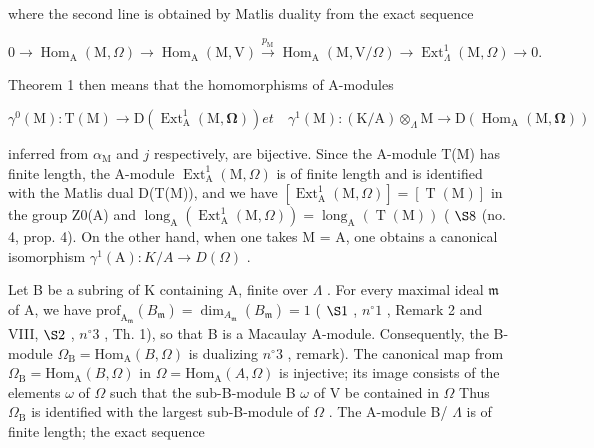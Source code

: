 where the second line is obtained by Matlis duality from the exact sequence

\[
0 \rightarrow \operatorname{Hom} _ {\mathrm{A}} (\mathrm{M}, \Omega) \longrightarrow \operatorname{Hom} _ {\mathrm{A}} (\mathrm{M}, \mathrm{V}) \xrightarrow {p _ {\mathrm{M}}} \operatorname{Hom} _ {\mathrm{A}} (\mathrm{M}, \mathrm{V} / \Omega) \longrightarrow \operatorname{Ext} _ {\Lambda} ^ {1} (\mathrm{M}, \Omega) \rightarrow 0.
\]

Theorem 1 then means that the homomorphisms of A-modules

\[
\gamma^ {0} (\mathrm{M}): \mathrm{T} (\mathrm{M}) \longrightarrow \mathrm{D} \left(\operatorname{Ext} _ {\mathrm{A}} ^ {1} (\mathrm{M}, \boldsymbol {\Omega})\right) e t \quad \gamma^ {1} (\mathrm{M}): (\mathrm{K} / \mathrm{A}) \otimes_ {\Lambda} \mathrm{M} \longrightarrow \mathrm{D} \left(\operatorname{Hom} _ {\mathrm{A}} (\mathrm{M}, \boldsymbol {\Omega})\right)
\]

inferred from \(\alpha_{\mathrm{M}}\) and \(j\) respectively, are bijective. Since the A-module T(M) has finite length, the A-module \(\operatorname{Ext}_{\mathrm{A}}^{1}(\mathrm{M},\Omega)\) is of finite length and is identified with the Matlis dual D(T(M)), and we have \([\operatorname{Ext}_{\mathrm{A}}^{1}(\mathrm{M},\Omega)] = [\operatorname{T}(\mathrm{M})]\) in the group Z0(A) and \(\operatorname{long}_{\mathrm{A}}(\operatorname{Ext}_{\mathrm{A}}^{1}(\mathrm{M},\Omega)) = \operatorname{long}_{\mathrm{A}}(\operatorname{T}(\mathrm{M}))\) ( \(\S 8\) (no. 4, prop. 4). On the other hand, when one takes M = A, one obtains a canonical isomorphism \(\gamma^{1}(\mathrm{A}):K / A\to D(\Omega)\) .

Let B be a subring of K containing A, finite over \(\Lambda\) . For every maximal ideal \(\mathfrak{m}\) of A, we have \(\mathrm{prof}_{\mathrm{A}_{\mathfrak{m}}}(B_{\mathfrak{m}}) = \dim_{A_{\mathfrak{m}}}(B_{\mathfrak{m}}) = 1\) ( \(\S 1\) , \(n^{\circ} 1\) , Remark 2 and VIII, \(\S 2\) , \(n^{\circ} 3\) , Th. 1), so that B is a Macaulay A-module. Consequently, the B-module \(\Omega_{\mathrm{B}} = \mathrm{Hom}_{\mathrm{A}}(B, \Omega)\) is dualizing \(n^{\circ} 3\) , remark). The canonical map from \(\Omega_{\mathrm{B}} = \mathrm{Hom}_{\mathrm{A}}(B, \Omega)\) in \(\Omega = \mathrm{Hom}_{\mathrm{A}}(A, \Omega)\) is injective; its image consists of the elements \(\omega\) of \(\Omega\) such that the sub-B-module B \(\omega\) of V be contained in \(\Omega\) Thus \(\Omega_{\mathrm{B}}\) is identified with the largest sub-B-module of \(\Omega\) . The A-module B/ \(\Lambda\) is of finite length; the exact sequence

